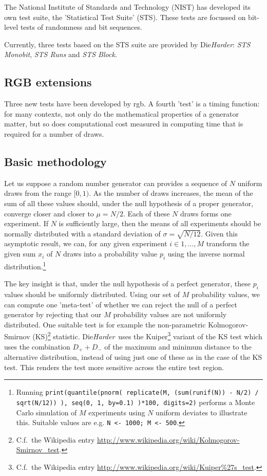 \documentclass[12pt]{article}
\let\code=\texttt
\newcommand{\dieharder}{\textrm{Die}\textsl{Harder}}
\newcommand{\wikinote}[2]{#2\footnote{C.f.~the Wikipedia entry \url{http://www.wikipedia.org/wiki/#1}.}}
\begin{document}
The National Institute of Standards and Technology (NIST) has developed its
own test suite, the 'Statistical Test Suite' (STS). These tests are focussed
on bit-level tests of randomness and bit sequences.   

Currently, three tests based on the STS suite are provided by \dieharder:
\textsl{STS Monobit}, \textsl{STS Runs} and \textsl{STS Block}. 

\subsection{RGB extensions}

Three new tests have been developed by rgb. A fourth 'test' is a timing
function: for many contexts, not only do the mathematical properties of a
generator matter, but so does computational cost measured in computing time
that is required for a number of draws.  

\subsection{Basic methodology}

Let us suppose a random number generator can provides a sequence of $N$
uniform draws from the range $[0, 1)$. As the number of draws increases, the
mean of the sum of all these values should, under the null hypothesis of a
proper generator, converge closer and closer to $\mu = N / 2$. Each of these
$N$ draws forms one experiment.  If $N$ is sufficiently large, then the means
of all experiments should be normally distributed with a standard deviation
of $\sigma = \sqrt{ N / 12}$. Given this asymptotic result, we can, for any
given experiment $i \in 1, \ldots, M$ transform the given sum $x_i$ of $N$
draws into a probability value $p_i$ using the inverse normal
distribution.\footnote{Running \code{print(quantile(pnorm( replicate(M,
    (sum(runif(N)) - N/2) / sqrt(N/12)) ), seq(0, 1, by=0.1) )*100,
    digits=2)} performs a Monte Carlo simulation of $M$ experiments using $N$
  uniform deviates to illustrate this. Suitable values are e.g. \code{N <-
    1000; M <- 500}.}

The key insight is that, under the null hypothesis of a perfect generator,
these $p_i$ values should be uniformly distributed. Using our set of $M$
probability values, we can compute one 'meta-test' of whether we can reject
the null of a perfect generator by rejecting that our $M$ probability values
are not uniformly distributed. One suitable test is for example the
non-parametric \wikinote{Kolmogorov-Smirnov\_test}{Kolmogorov-Smirnov (KS)}
statistic.  \dieharder\ uses the \wikinote{Kuiper\%27s\_test}{Kuiper} variant
of the KS test which uses the combination $D_+ + D_-$ of the maximum and
minimum distance to the alternative distribution, instead of using just one
of these as in the case of the KS test.  This renders the test more sensitive
across the entire test region.
\end{document}
